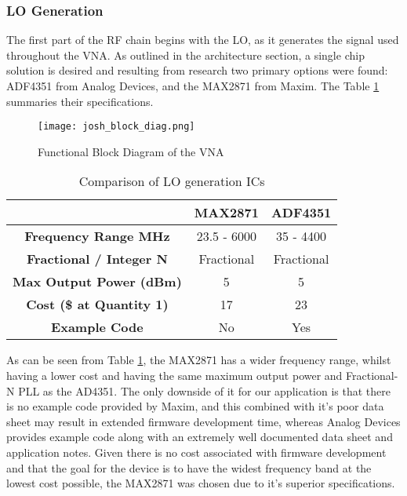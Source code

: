\subsubsection{LO Generation}
The first part of the RF chain begins with the LO, as it generates the signal used throughout the VNA. As outlined in the architecture section, a single chip solution is desired and resulting from research two primary options were found: ADF4351 from Analog Devices, and the MAX2871 from Maxim. The Table \ref{table:lo_comparison} summaries their specifications. 

\begin{landscape}
	\begin{figure}
		\centering
		\texttt{[image: josh\_block\_diag.png]}
		\caption{Functional Block Diagram of the VNA}
		\label{fig:vna_block_diag}
	\end{figure}
\end{landscape}

\begin{table}[H]
	\caption{Comparison of LO generation ICs}
	\label{table:lo_comparison}
	\centering
\begin{tabular}{|c|c|c|}
	\hline
	\multicolumn{1}{|l|}{}          & \textbf{MAX2871} & \textbf{ADF4351} \\ \hline
	\textbf{Frequency Range MHz}    & 23.5 - 6000      & 35 - 4400        \\ \hline
	\textbf{Fractional / Integer N} & Fractional       & Fractional       \\ \hline
	\textbf{Max Output Power (dBm)}   & 5                & 5                \\ \hline
	\textbf{Cost (\$ at Quantity 1)}& 17               & 23             \\ \hline
	\textbf{Example Code}           & No               & Yes              \\ \hline
\end{tabular}
\end{table}
\vspace{-1em}
As can be seen from Table \ref{table:lo_comparison}, the MAX2871 has a wider frequency range, whilst having a lower cost and having the same maximum output power and Fractional-N PLL as the AD4351. The only downside of it for our application is that there is no example code provided by Maxim, and this combined with it's poor data sheet may result in extended firmware development time, whereas Analog Devices provides example code along with an extremely well documented data sheet and application notes. Given there is no cost associated with firmware development and that the goal for the device is to have the widest frequency band at the lowest cost possible, the MAX2871 was chosen due to it's superior specifications. 

